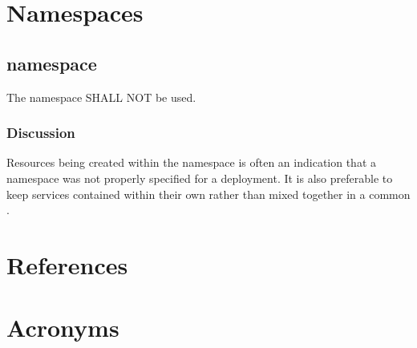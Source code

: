 \documentclass[PMO,authoryear,toc]{lsstdoc}
\begin{document}
\section{Namespaces}\label{sec:ns}

\subsection{ namespace}

The  namespace SHALL NOT be used.

\subsubsection{Discussion}

Resources being created within the  namespace is often an indication that a namespace was not properly specified for a deployment. It is also preferable to keep services contained within their own  rather than mixed together in a common .

\appendix
\section{References} \label{sec:bib}
\renewcommand{\refname}{} %


\section{Acronyms} \label{sec:acronyms}

\end{document}
